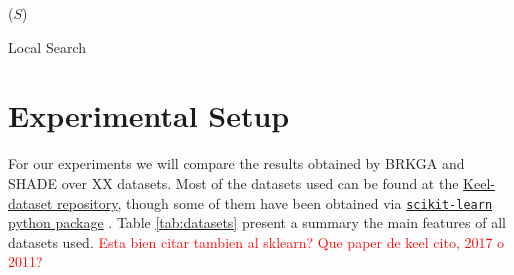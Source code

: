 \documentclass[review]{elsarticle}
\begin{document}
\begin{algorithm}
	\SetNlSkip{0.5em}
	\BlankLine
	\BlankLine
	\KwRet ($S$)
	
\caption{Local Search}\label{alg:LS}
\end{algorithm}

\clearpage

\section{Experimental Setup}

For our experiments we will compare the results obtained by BRKGA and SHADE over XX datasets. Most of the datasets used can be found at the \href{https://sci2s.ugr.es/keel/category.php?cat=clas}{Keel-dataset repository}\cite{triguero2017keel}, though some of them have been obtained via
\href{https://scikit-learn.org/stable/datasets/index.html}{\texttt{scikit-learn} python package} \cite{scikit-learn}. Table \ref{tab:datasets} present a summary the main features of all datasets used. \textcolor{red}{Esta bien citar tambien al sklearn? Que paper de keel cito, 2017 o 2011?}
\end{document}
